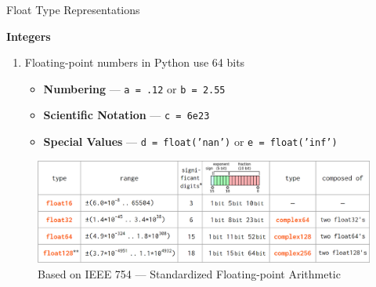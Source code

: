 \documentclass[
	11pt, 
]{beamer}
\begin{document}
\begin{frame}[fragile]{Float Type Representations} %

\begin{block}{\textbf{Integers}}
\begin{enumerate}
    \item Floating-point numbers in Python use 64 bits
        \begin{itemize}
            \item \textbf{Numbering} --- \hspace{.1cm} \texttt{a = .12} \hspace{.1cm} or \hspace{.3cm} \texttt{b = 2.55}
            \item \textbf{Scientific Notation} --- \hspace{.1cm} \texttt{c = 6e23}
            \item \textbf{Special Values} --- \texttt{d = float('nan')}  or  \hspace{.1cm} \texttt{e = float('inf')}
        \end{itemize}


\end{enumerate}
\end{block}

\begin{figure}
    \centering
    \includegraphics[width = 12cm]{Images/bits.png}
    \caption{Based on IEEE 754 --- Standardized Floating-point Arithmetic}
\end{figure}

\end{frame}

\end{document}

